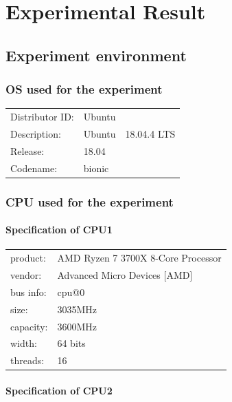 \chapter{Experimental Result}
\label{chapter:Experimental_Result}

\section{Experiment environment}

\subsection{OS used for the experiment}

\begin{tabular}{lll}
Distributor ID: & Ubuntu &             \\ 
Description:    & Ubuntu & 18.04.4 LTS \\
Release:        & 18.04  &             \\
Codename:       & bionic &             \\
\end{tabular} 


\subsection{CPU used for the experiment}

\subsubsection{Specification of CPU1}

\begin{tabular}{ll}
product:     & AMD Ryzen 7 3700X 8-Core Processor \\
vendor:      & Advanced Micro Devices [AMD] \\
bus info:    & cpu@0 \\
size:        & 3035MHz \\
capacity:    & 3600MHz \\
width:       & 64 bits \\
threads:     & 16 \\
\end{tabular} 

\subsubsection{Specification of CPU2}

